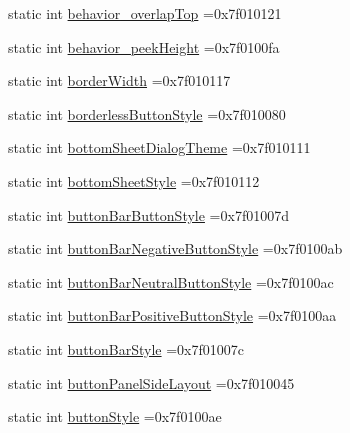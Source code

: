 \begin{DoxyCompactItemize}
\item 
static int \hyperlink{classandroid_1_1support_1_1v7_1_1appcompat_1_1R_1_1attr_a53ab63799d595c3c29a56e8c4364acd3}{behavior\+\_\+overlap\+Top} =0x7f010121
\item 
static int \hyperlink{classandroid_1_1support_1_1v7_1_1appcompat_1_1R_1_1attr_a6efba039d772590549dfeaf0b0eeae12}{behavior\+\_\+peek\+Height} =0x7f0100fa
\item 
static int \hyperlink{classandroid_1_1support_1_1v7_1_1appcompat_1_1R_1_1attr_a55e8c33b36302cff431e988e21390c49}{border\+Width} =0x7f010117
\item 
static int \hyperlink{classandroid_1_1support_1_1v7_1_1appcompat_1_1R_1_1attr_a4a7129bedf5616c7e7d42c253187a694}{borderless\+Button\+Style} =0x7f010080
\item 
static int \hyperlink{classandroid_1_1support_1_1v7_1_1appcompat_1_1R_1_1attr_a3fee06f2eb3a9ae15a03adaeda42147b}{bottom\+Sheet\+Dialog\+Theme} =0x7f010111
\item 
static int \hyperlink{classandroid_1_1support_1_1v7_1_1appcompat_1_1R_1_1attr_a4ac92cbe973891bb7a82263ec54fdd6e}{bottom\+Sheet\+Style} =0x7f010112
\item 
static int \hyperlink{classandroid_1_1support_1_1v7_1_1appcompat_1_1R_1_1attr_ac3b82cc76ec0827264fb6a5e4ec308b3}{button\+Bar\+Button\+Style} =0x7f01007d
\item 
static int \hyperlink{classandroid_1_1support_1_1v7_1_1appcompat_1_1R_1_1attr_aa0cf6c74c730bec0f705aa4117be0519}{button\+Bar\+Negative\+Button\+Style} =0x7f0100ab
\item 
static int \hyperlink{classandroid_1_1support_1_1v7_1_1appcompat_1_1R_1_1attr_abd23fc1a59a95a9af1c5648bc93cb339}{button\+Bar\+Neutral\+Button\+Style} =0x7f0100ac
\item 
static int \hyperlink{classandroid_1_1support_1_1v7_1_1appcompat_1_1R_1_1attr_a919556ddd9405e7315143fdba7448487}{button\+Bar\+Positive\+Button\+Style} =0x7f0100aa
\item 
static int \hyperlink{classandroid_1_1support_1_1v7_1_1appcompat_1_1R_1_1attr_a6910f254c6c12670fb4650919c7e0b67}{button\+Bar\+Style} =0x7f01007c
\item 
static int \hyperlink{classandroid_1_1support_1_1v7_1_1appcompat_1_1R_1_1attr_adf77db2087554bf02805ea33fde73d79}{button\+Panel\+Side\+Layout} =0x7f010045
\item 
static int \hyperlink{classandroid_1_1support_1_1v7_1_1appcompat_1_1R_1_1attr_a6706ae73b0588849f93a4121b5769ea4}{button\+Style} =0x7f0100ae
\item 

\end{DoxyCompactItemize}

